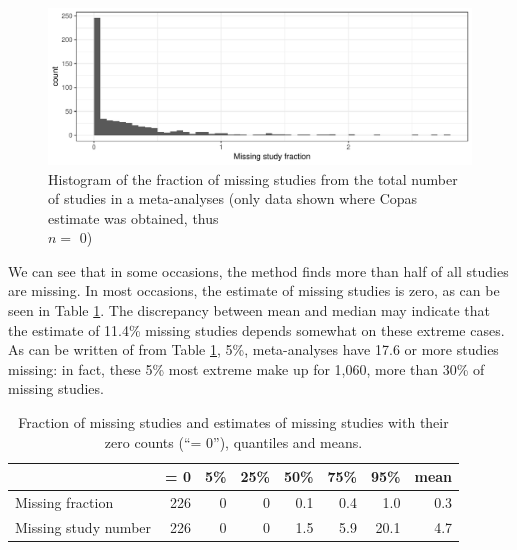 \documentclass[11pt,a4paper,twoside]{book}\usepackage[]{graphicx}\usepackage[]{color}
\newenvironment{knitrout}{}{} %
\begin{document}
\begin{figure}
\begin{knitrout}
\color{fgcolor}

{\centering \includegraphics[width=\textwidth-3cm]{figure/ch03_figunnamed-chunk-27-1} 

}



\end{knitrout}
\caption{Histogram of the fraction of missing studies from the total number of studies in a meta-analyses (only data shown where Copas estimate was obtained, thus \\$n =$ 0)}
\label{fig:copas.missing}
\end{figure}

We can see that in some occasions, the method finds more than half of all studies are missing. In most occasions, the estimate of missing studies is zero, as can be seen in Table \ref{copas.missing}. The discrepancy between mean and median may indicate that the estimate of 11.4\% missing studies depends somewhat on these extreme cases. As can be written of from Table \ref{copas.missing}, 5\%,  meta-analyses have 17.6 or more studies missing: in fact, these 5\% most extreme make up for 1,060, more than 30\% of missing studies.

\begin{table}[ht]
\centering
\begingroup\footnotesize
\begin{tabular}{lrrrrrrr}
  \hline
 & = 0 & 5\% & 25\% & 50\% & 75\% & 95\% & mean \\ 
  \hline
Missing fraction & 226 & 0 & 0 & 0.1 & 0.4 & 1.0 & 0.3 \\ 
  Missing study number & 226 & 0 & 0 & 1.5 & 5.9 & 20.1 & 4.7 \\ 
   \hline
\end{tabular}
\endgroup
\caption{Fraction of missing studies and estimates of missing studies with their zero counts (``= 0''), quantiles and means.} 
\label{copas.missing}
\end{table}
\end{document}
